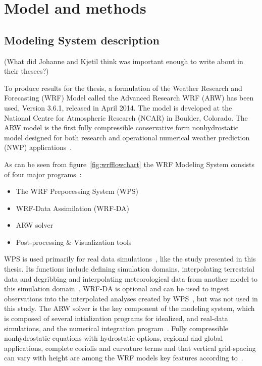 \chapter{Model and methods}
\label{chap:modmet}
\section{Modeling System description}
\label{sec:modeldes}
(What did Johanne and Kjetil think was important enough to write about in their thesees?)

To produce results for the thesis, a formulation of the Weather Research and Forecasting (WRF) Model called the Advanced Research WRF (ARW) has been used, Version 3.6.1, released in April 2014. The model is developed at the National Centre for Atmospheric Research (NCAR) in Boulder, Colorado. The ARW model is the first fully compressible conservative form nonhydrostatic model designed for both research and operational numerical weather prediction (NWP) applications~\citep{Skamarock2008}. 

As can be seen from figure~\ref{fig:wrfflowchart} the WRF Modeling System consists of four major programs~\citep{Wang2012}:
\begin{itemize}
\item The WRF Prepocessing System (WPS)
\item WRF-Data Assimilation (WRF-DA)
\item ARW solver
\item Post-processing \& Visualization tools
\end{itemize}

WPS is used primarily for real data simulations~\citep{Wang2015}, like the study presented in this thesis. Its functions include defining simulation domains, interpolating terrestrial data and degribbing and interpolating meteorological data from another model to this simulation domain~\citep{Wang2015}. WRF-DA is optional and can be used to ingest observations into the interpolated analyses created by WPS~\citep{Wang2015}, but was not used in this study. The ARW solver is the key component of the modeling system, which is composed of several intialization programs for idealized, and real-data simulations, and the numerical integration program~\citep{Wang2015}. Fully compressible nonhydrostatic equations with hydrostatic options, regional and global applications, complete coriolis and curvature terms and that vertical grid-spacing can vary with height are among the WRF models key features according to~\cite{Wang2015}.

